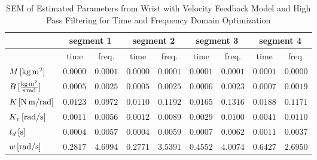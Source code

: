 \documentclass[11pt,a4paper]{article}
\begin{document}
\begin{table}
    \centering
    \begin{tabular}{|l|r|r|r|r|r|r|r|r|}
        \hline
        \nonumber &
            \multicolumn{2}{c|}{segment 1} &
            \multicolumn{2}{c|}{segment 2} &
            \multicolumn{2}{c|}{segment 3} &
            \multicolumn{2}{c|}{segment 4} \\
        \hline
        \nonumber &
            \multicolumn{1}{c|}{time} & \multicolumn{1}{c|}{freq.} &
            \multicolumn{1}{c|}{time} & \multicolumn{1}{c|}{freq.} &
            \multicolumn{1}{c|}{time} & \multicolumn{1}{c|}{freq.} &
            \multicolumn{1}{c|}{time} & \multicolumn{1}{c|}{freq.} \\
        \hline
        $\unit[M]{[kg\,m^2]}$ &
            $0.0000$ & $0.0001$ & $0.0000$ & $0.0001$ &
            $0.0001$ & $0.0001$ & $0.0001$ & $0.0000$ \\
        $\unit[B]{[\frac{kg\,m^2}{s\,rad}]}$ &
            $0.0005$ & $0.0025$ & $0.0005$ & $0.0025$ &
            $0.0006$ & $0.0023$ & $0.0007$ & $0.0019$ \\
        $\unit[K]{[N\,m/rad]}$ &
            $0.0123$ & $0.0972$ & $0.0110$ & $0.1192$ &
            $0.0165$ & $0.1316$ & $0.0188$ & $0.1171$ \\
        $\unit[K_v]{[rad/s]}$ &
            $0.0011$ & $0.0056$ & $0.0012$ & $0.0089$ &
            $0.0029$ & $0.0100$ & $0.0041$ & $0.0110$ \\
        $\unit[t_d]{[s]}$ &
            $0.0004$ & $0.0057$ & $0.0004$ & $0.0059$ &
            $0.0007$ & $0.0062$ & $0.0011$ & $0.0037$ \\
        $\unit[w]{[rad/s]}$ &
            $0.2817$ & $4.6994$ & $0.2771$ & $3.5391$ &
            $0.4552$ & $4.0074$ & $0.6427$ & $2.6950$ \\
        \hline
    \end{tabular}
    \caption{SEM of Estimated Parameters from Wrist with Velocity Feedback
        Model and High Pass Filtering for Time and Frequency Domain
        Optimization}
    \label{tab:segsemhp}
\end{table}
\end{document}
